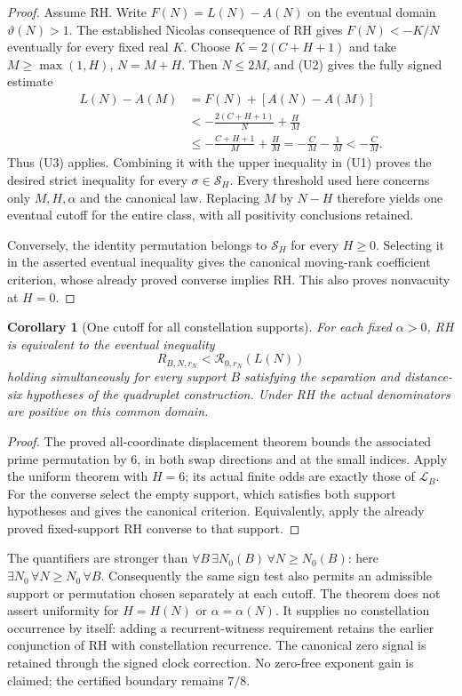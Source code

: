 \documentclass[11pt]{article}
\newtheorem{corollary}[theorem]{Corollary}
\theoremstyle{definition}
\begin{document}
\begin{proof}
Assume RH. Write $F(N)=L(N)-A(N)$ on the eventual domain
$\vartheta(N)>1$. The established Nicolas consequence of RH gives
$F(N)<-K/N$ eventually for every fixed real $K$.
Choose $K=2(C+H+1)$ and take $M\ge\max(1,H)$, $N=M+H$.
Then $N\le2M$, and (U2) gives the fully signed estimate
\[
 \begin{split}
 L(N)-A(M)
 &= F(N)+[A(N)-A(M)]\\
 &<-\frac{2(C+H+1)}{N}+\frac H M\\
 &\le-\frac{C+H+1}{M}+\frac H M
   =-\frac C M-\frac1M<-\frac C M.
 \end{split}
\]
Thus (U3) applies. Combining it with the upper inequality in (U1)
proves the desired strict inequality for every $\sigma\in\mathcal S_H$.
Every threshold used here concerns only $M,H,\alpha$ and the canonical
law. Replacing $M$ by $N-H$ therefore yields one eventual cutoff for
the entire class, with all positivity conclusions retained.

Conversely, the identity permutation belongs to $\mathcal S_H$ for
every $H\ge0$. Selecting it in the asserted eventual inequality gives
the canonical moving-rank coefficient criterion, whose already proved
converse implies RH. This also proves nonvacuity at $H=0$.
\end{proof}

\begin{corollary}[One cutoff for all constellation supports]
For each fixed $\alpha>0$, RH is equivalent to the eventual inequality
\[
 R_{B,N,r_N}<\mathcal R_{0,r_N}(L(N))
\]
holding simultaneously for every support $B$ satisfying the separation
and distance-six hypotheses of the quadruplet construction.
Under RH the actual denominators are positive on this common domain.
\end{corollary}

\begin{proof}
The proved all-coordinate displacement theorem bounds the associated
prime permutation by $6$, in both swap directions and at the small
indices. Apply the uniform theorem with $H=6$; its actual finite odds
are exactly those of $\mathcal L_B$.
For the converse select the empty support, which satisfies both support
hypotheses and gives the canonical criterion. Equivalently, apply the
already proved fixed-support RH converse to that support.
\end{proof}

The quantifiers are stronger than
$\forall B\,\exists N_0(B)\,\forall N\ge N_0(B)$:
here $\exists N_0\,\forall N\ge N_0\,\forall B$.
Consequently the same sign test also permits an admissible support or
permutation chosen separately at each cutoff.
The theorem does not assert uniformity for $H=H(N)$ or
$\alpha=\alpha(N)$. It supplies no constellation occurrence by itself:
adding a recurrent-witness requirement retains the earlier conjunction
of RH with constellation recurrence. The canonical zero signal is
retained through the signed clock correction. No zero-free exponent
gain is claimed; the certified boundary remains $7/8$.
\end{document}
